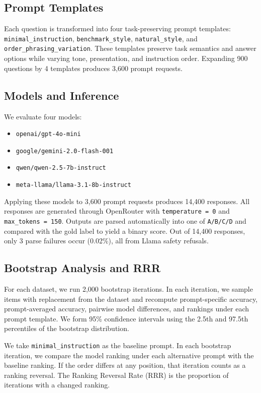 \documentclass[11pt]{article}
\begin{document}
\subsection{Prompt Templates}

Each question is transformed into four task-preserving prompt templates:
\texttt{minimal\_instruction}, \texttt{benchmark\_style}, \texttt{natural\_style}, and \texttt{order\_phrasing\_variation}. These templates preserve task semantics and answer options while varying tone, presentation, and instruction order. Expanding 900 questions by 4 templates produces 3,600 prompt requests.

\subsection{Models and Inference}

We evaluate four models:
\begin{itemize}[leftmargin=1.5em]
\item \texttt{openai/gpt-4o-mini}
\item \texttt{google/gemini-2.0-flash-001}
\item \texttt{qwen/qwen-2.5-7b-instruct}
\item \texttt{meta-llama/llama-3.1-8b-instruct}
\end{itemize}

Applying these models to 3,600 prompt requests produces 14,400 responses. All responses are generated through OpenRouter with \texttt{temperature = 0} and \texttt{max\_tokens = 150}. Outputs are parsed automatically into one of \texttt{A/B/C/D} and compared with the gold label to yield a binary score. Out of 14,400 responses, only 3 parse failures occur (0.02\%), all from Llama safety refusals.

\subsection{Bootstrap Analysis and RRR}

For each dataset, we run 2,000 bootstrap iterations. In each iteration, we sample items with replacement from the dataset and recompute prompt-specific accuracy, prompt-averaged accuracy, pairwise model differences, and rankings under each prompt template. We form 95\% confidence intervals using the 2.5th and 97.5th percentiles of the bootstrap distribution.

We take \texttt{minimal\_instruction} as the baseline prompt. In each bootstrap iteration, we compare the model ranking under each alternative prompt with the baseline ranking. If the order differs at any position, that iteration counts as a ranking reversal. The Ranking Reversal Rate (RRR) is the proportion of iterations with a changed ranking.
\end{document}
